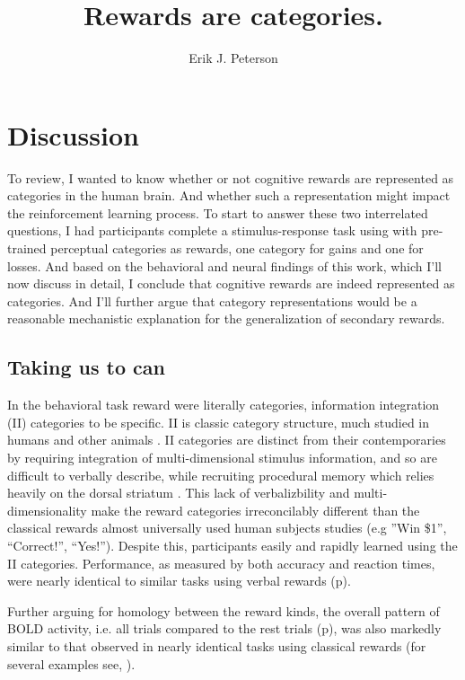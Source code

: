 \documentclass[doc,12pt]{apa}        %
\title{Rewards are categories.}
\author{Erik J. Peterson} \affiliation{Dept. of Psychology \\ Colorado State University \\ Fort Collins, CO}
\begin{document}
 
\maketitle
\doublespacing

\section{Discussion} %
\label{sec:dicussion}
To review, I wanted to know whether or not cognitive rewards are represented as categories in the human brain.  And whether such a representation might impact the reinforcement learning process.  To start to answer these two interrelated questions, I had participants complete a stimulus-response task using with pre-trained perceptual categories as rewards, one category for gains and one for losses.  And based on the behavioral and neural findings of this work, which I'll now discuss in detail, I conclude that cognitive rewards are indeed represented as categories.  And I'll further argue that category representations would be a reasonable mechanistic explanation for the generalization of secondary rewards.

\subsection{Taking us to can}
\label{sub:tocan}
In the behavioral task reward were literally categories, information integration (II) categories to be specific.  II is classic category structure, much studied in humans and other animals \cite{Smith:2011p9101,Ashby:2011p9148,Smith:2010p9713}.  II categories are distinct from their contemporaries by requiring integration of multi-dimensional stimulus information, and so are difficult to verbally describe, while recruiting procedural memory which relies heavily on the dorsal striatum \cite{Ashby:1998p9716}.   This lack of verbalizbility and multi-dimensionality make the reward categories irreconcilably different than the classical rewards almost universally used human subjects studies (e.g ''Win \$1'', ``Correct!'', ``Yes!'').  Despite this, participants easily and rapidly learned using the II categories.  Performance, as measured by both accuracy and reaction times, were nearly identical to similar tasks using verbal rewards (p\pageref{subsub:wellbehaved}).  

Further arguing for homology between the reward kinds, the overall pattern of BOLD activity, i.e. all trials compared to the rest trials (p\pageref{sub:blob}), was also markedly similar to that observed in nearly identical tasks using classical rewards (for several examples see, ).
\end{document}
